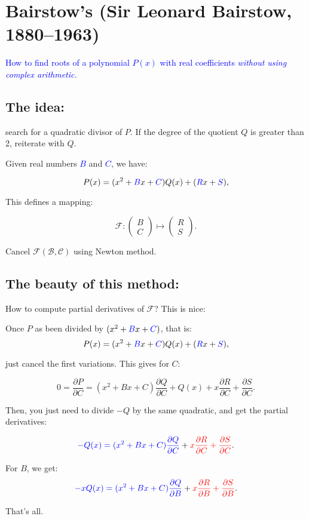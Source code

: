 \documentclass[11pt]{amsart}
\begin{document}
  \section*{Bairstow's (Sir Leonard Bairstow,
    1880--1963)}

  \begin{center}
    \textcolor{blue}{\large How to find roots of a polynomial  $P(x)$
      with real coefficients 
        \emph{without using complex arithmetic.}}
  \end{center}
   \subsection*{The idea:}    

  search for a quadratic divisor of $P$. If the degree of the quotient $Q$
  is greater than 2, reiterate with $Q$.

  
 

  Given real numbers \textcolor{blue}{$B$} and \textcolor{blue}{$C$},
  we have:

  $$P(x)= (x^2+\textcolor{blue}{B}x+\textcolor{blue}{C}) Q(x)+ (\textcolor{blue}{R}x+\textcolor{blue}{S}),$$

  This defines a mapping:
  
$$\mathcal{F}: \begin{pmatrix}B \\ C  \end{pmatrix}
\mapsto  \begin{pmatrix}R\\S\end{pmatrix}.$$

  Cancel $\mathcal{F(B,C)}$ using Newton method.

  \subsection*{The beauty of this method:}
  
How to compute partial derivatives of  $\mathcal{F}$? This is nice:

Once $P$ as been divided by
$(x^2+\textcolor{blue}{B}x+\textcolor{blue}{C})$, that is:
$$P(x)= (x^2+\textcolor{blue}{B}x+\textcolor{blue}{C}) Q(x)+ (\textcolor{blue}{R}x+\textcolor{blue}{S}),$$

just cancel the first variations. This gives for $C$:

$$0 = \frac{\partial P}{\partial C}= (x^2+Bx+C)\frac{\partial
Q}{\partial C}+ Q(x) +x \frac{\partial R}{\partial C}+\frac{\partial
S}{\partial C}. $$

Then, you just need to divide $-Q$ by the same quadratic, and get the
partial derivatives:

$$\textcolor{blue}{-Q(x)=(x^2+Bx+C)\frac{\partial Q}{\partial C}}+\textcolor{red}{x \frac{\partial R}{\partial C}+\frac{\partial
S}{\partial C}} .$$

For $B$, we get:
$$\textcolor{blue}{-xQ(x)=(x^2+Bx+C)\frac{\partial Q}{\partial B}}+
\textcolor{red}{x \frac{\partial R}{\partial B}+\frac{\partial
S}{\partial B} }.$$

That's all.


  
\end{document}
